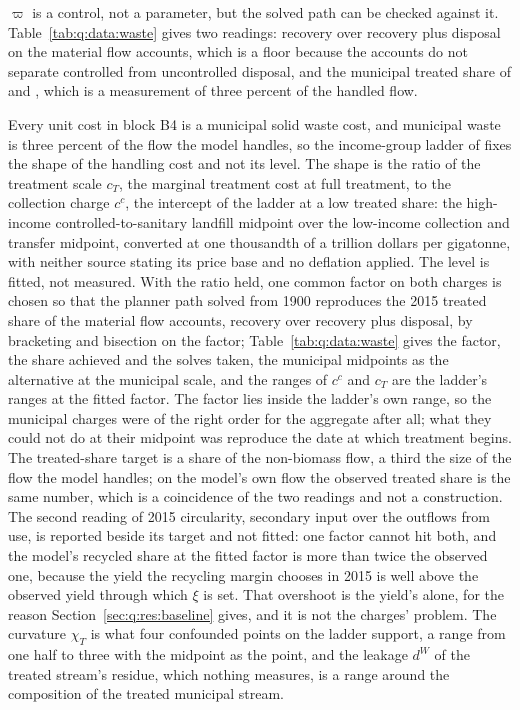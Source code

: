  $\varpi$ is a control, not a parameter, but the solved path can be checked against it. Table~\ref{tab:q:data:waste} gives two readings: recovery over recovery plus disposal on the material flow accounts, which is a floor because the accounts do not separate controlled from uncontrolled disposal, and the municipal treated share of \textcite{unep2024} and \textcite{kaza2018}, which is a measurement of three percent of the handled flow.

 Every unit cost in block B4 is a municipal solid waste cost, and municipal waste is three percent of the flow the model handles, so the income-group ladder of \textcite{kaza2018} fixes the shape of the handling cost and not its level. The shape is the ratio of the treatment scale $c_T$, the marginal treatment cost at full treatment, to the collection charge $c^c$, the intercept of the ladder at a low treated share: the high-income controlled-to-sanitary landfill midpoint over the low-income collection and transfer midpoint, converted at one thousandth of a trillion dollars per gigatonne, with neither source stating its price base and no deflation applied. The level is fitted, not measured. With the ratio held, one common factor on both charges is chosen so that the planner path solved from 1900 reproduces the 2015 treated share of the material flow accounts, recovery over recovery plus disposal, by bracketing and bisection on the factor; Table~\ref{tab:q:data:waste} gives the factor, the share achieved and the solves taken, the municipal midpoints as the alternative at the municipal scale, and the ranges of $c^c$ and $c_T$ are the ladder's ranges at the fitted factor. The factor lies inside the ladder's own range, so the municipal charges were of the right order for the aggregate after all; what they could not do at their midpoint was reproduce the date at which treatment begins. The treated-share target is a share of the non-biomass flow, a third the size of the flow the model handles; on the model's own flow the observed treated share is the same number, which is a coincidence of the two readings and not a construction. The second reading of 2015 circularity, secondary input over the outflows from use, is reported beside its target and not fitted: one factor cannot hit both, and the model's recycled share at the fitted factor is more than twice the observed one, because the yield the recycling margin chooses in 2015 is well above the observed yield through which $\xi$ is set. That overshoot is the yield's alone, for the reason Section~\ref{sec:q:res:baseline} gives, and it is not the charges' problem. The curvature $\chi_T$ is what four confounded points on the ladder support, a range from one half to three with the midpoint as the point, and the leakage $d^W$ of the treated stream's residue, which nothing measures, is a range around the composition of the treated municipal stream.


